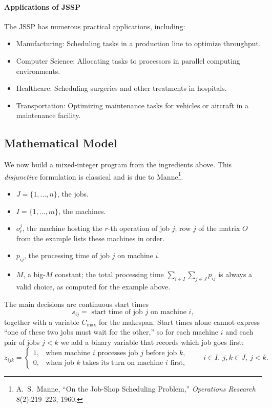 \paragraph{Applications of JSSP}
The JSSP has numerous practical applications, including:
\begin{itemize}
  \item Manufacturing: Scheduling tasks in a production line to optimize throughput.
  \item Computer Science: Allocating tasks to processors in parallel computing environments.
  \item Healthcare: Scheduling surgeries and other treatments in hospitals.
  \item Transportation: Optimizing maintenance tasks for vehicles or aircraft in a maintenance facility.
\end{itemize}


\subsection{Mathematical Model}

We now build a mixed-integer program from the ingredients above.
This \emph{disjunctive} formulation is classical and is due to Manne\footnote{A.~S.~Manne, ``On the Job-Shop Scheduling Problem,'' \emph{Operations Research} 8(2):219--223, 1960.}.

\begin{itemize}
  \item $J = \{1, \ldots, n\}$, the jobs.
  \item $I = \{1, \ldots, m\}$, the machines.
\end{itemize}
\begin{itemize}
  \item $o_r^j$, the machine hosting the $r$-th operation of job $j$; row $j$ of the matrix $O$ from the example lists these machines in order.
  \item $p_{ij}$, the processing time of job $j$ on machine $i$.
  \item $M$, a big-$M$ constant; the total processing time $\sum_{i \in I} \sum_{j \in J} p_{ij}$ is always a valid choice, as computed for the example above.
\end{itemize}
The main decisions are continuous start times
$$
s_{ij} = \text{ start time of job $j$ on machine $i$},
$$
together with a variable $C_{\max}$ for the makespan.
Start times alone cannot express ``one of these two jobs must wait for the other,'' so for each machine $i$ and each pair of jobs $j < k$ we add a binary variable that records which job goes first:
$$
z_{ijk} = \begin{cases} 1, & \text{when machine } i \text{ processes job } j \text{ before job } k,\\ 0, & \text{when job } k \text{ takes its turn on machine } i \text{ first,} \end{cases}
\qquad i \in I, \ j,k \in J, \ j < k.
$$

